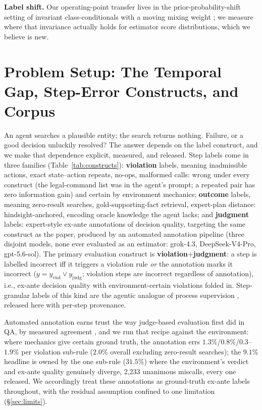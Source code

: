 \documentclass{article}
\begin{document}
\textbf{Label shift.} Our operating-point transfer lives in the
prior-probability-shift setting of invariant class-conditionals with a moving
mixing weight \citep{saerens2002adjusting,lipton2018detecting}; we measure
where that invariance actually holds for estimator score distributions, which
we believe is new.

\section{Problem Setup: The Temporal Gap, Step-Error Constructs, and Corpus}
\label{sec:labels}
An agent searches a plausible entity; the search returns nothing. Failure, or a
good decision unluckily resolved? The answer depends on the label construct,
and we make that dependence explicit, measured, and released. Step labels come
in three families (Table~\ref{tab:constructs}): \textbf{violation} labels, meaning inadmissible actions, exact state--action repeats, no-ops, malformed calls: wrong under every construct (the legal-command list was in
the agent's prompt; a repeated pair has zero information gain) and certain by environment
mechanics; \textbf{outcome} labels, meaning zero-result searches, gold-supporting-fact
retrieval, expert-plan distance: hindsight-anchored, encoding oracle
knowledge the agent lacks; and \textbf{judgment} labels: expert-style ex-ante annotations of decision
quality, targeting the same construct as the paper, produced by an automated
annotation pipeline (three disjoint models, none ever evaluated as an
estimator: grok-4.3, DeepSeek-V4-Pro, gpt-5.6-sol). The
primary evaluation construct is \textbf{violation$+$judgment}: a step is
labelled incorrect iff it triggers a violation rule \emph{or} the annotation
marks it incorrect ($y = y_{\mathrm{viol}} \lor y_{\mathrm{judg}}$; violation
steps are incorrect regardless of annotation), i.e., ex-ante decision quality
with environment-certain violations folded in.
Step-granular labels of this kind are the agentic analogue of process
supervision \citep{lightman2024lets}, released here with per-step provenance.

Automated annotation earns trust the way judge-based evaluation first did in
QA, by measured agreement \citep{zheng2023judging}, and we run that recipe
against the environment: where mechanics give certain ground truth, the
annotation errs
$1.3\%$/$0.8\%$/$0.3$--$1.9\%$ per violation sub-rule ($2.0\%$ overall
excluding zero-result searches); the $9.1\%$ headline is owned by the one
sub-rule ($31.5\%$) where the environment's verdict and ex-ante quality
genuinely diverge, 2{,}233 unanimous miscalls, every one released. We accordingly treat these annotations as ground-truth ex-ante labels
throughout, with the residual assumption confined to one limitation
(\S\ref{sec:limits}).
\end{document}
